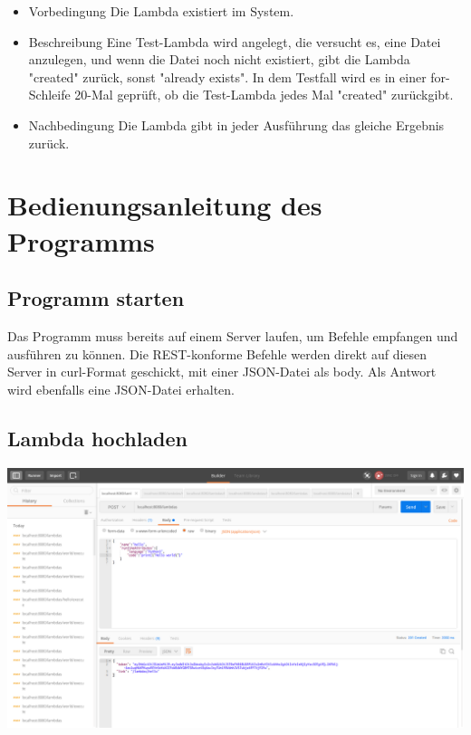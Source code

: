 \documentclass[a4paper,20pt,oneside]{book}
\begin{document}
\begin{itemize}
\item Vorbedingung\linebreak
Die Lambda existiert im System.
\item Beschreibung\linebreak
Eine Test-Lambda wird angelegt, die versucht es, eine Datei anzulegen, und wenn die Datei noch nicht existiert, gibt die Lambda "created" zurück, sonst "already exists". In dem Testfall wird es in einer for-Schleife 20-Mal geprüft, ob die Test-Lambda jedes Mal "created" zurückgibt.
\item Nachbedingung\linebreak
Die Lambda gibt in jeder Ausführung das gleiche Ergebnis zurück.
\end{itemize}
	\chapter{Bedienungsanleitung des Programms}
	\section{Programm starten}
	Das Programm muss bereits auf einem Server laufen, um Befehle empfangen und ausführen zu können. Die REST-konforme Befehle werden direkt auf diesen Server in curl-Format geschickt, mit einer JSON-Datei als body. Als Antwort wird ebenfalls eine JSON-Datei erhalten. 
	\section{Lambda hochladen}	
	\includegraphics[width=\textwidth]{upload.png}
\end{document}
